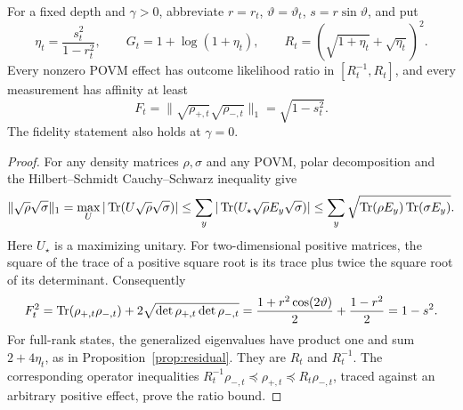 \begin{lemma}
\label{lem:block-fidelity}
For a fixed depth and $\gamma>0$, abbreviate
$r=r_t$, $\vartheta=\vartheta_t$, $s=r\sin\vartheta$, and put
\begin{equation}\label{eq:eta-G}
 \eta_t=\frac{s_t^2}{1-r_t^2},\qquad
 G_t=1+\log(1+\eta_t),\qquad
 R_t=(\sqrt{1+\eta_t}+\sqrt{\eta_t})^2.
\end{equation}
Every nonzero POVM effect has outcome likelihood ratio in
$[R_t^{-1},R_t]$, and every measurement has affinity at least
\begin{equation}\label{eq:block-fidelity}
 F_t=\|\sqrt{\rho_{+,t}}\sqrt{\rho_{-,t}}\|_1
     =\sqrt{1-s_t^2}.
\end{equation}
The fidelity statement also holds at $\gamma=0$.
\end{lemma}
\begin{proof}
For any density matrices $\rho,\sigma$ and any POVM, polar decomposition
and the Hilbert--Schmidt Cauchy--Schwarz inequality give
\[
 \|\sqrt\rho\sqrt\sigma\|_1
 =\max_U|\operatorname{Tr}(U\sqrt\rho\sqrt\sigma)|
 \leq\sum_y|\operatorname{Tr}(U_\star\sqrt\rho E_y\sqrt\sigma)|
 \leq\sum_y\sqrt{\operatorname{Tr}(\rho E_y)\operatorname{Tr}(\sigma E_y)}.
\]
Here $U_\star$ is a maximizing unitary. For two-dimensional positive
matrices, the square of the trace of a positive square root is its trace
plus twice the square root of its determinant. Consequently
\[
 F_t^2=\operatorname{Tr}(\rho_{+,t}\rho_{-,t})
            +2\sqrt{\det\rho_{+,t}\det\rho_{-,t}}
 =\frac{1+r^2\cos(2\vartheta)}2+\frac{1-r^2}2
 =1-s^2.
\]
For full-rank states, the generalized eigenvalues have product one and
sum $2+4\eta_t$, as in Proposition~\ref{prop:residual}. They are
$R_t$ and $R_t^{-1}$. The corresponding operator inequalities
$R_t^{-1}\rho_{-,t}\preceq\rho_{+,t}\preceq R_t\rho_{-,t}$,
traced against an arbitrary positive effect, prove the ratio bound.
\end{proof}

